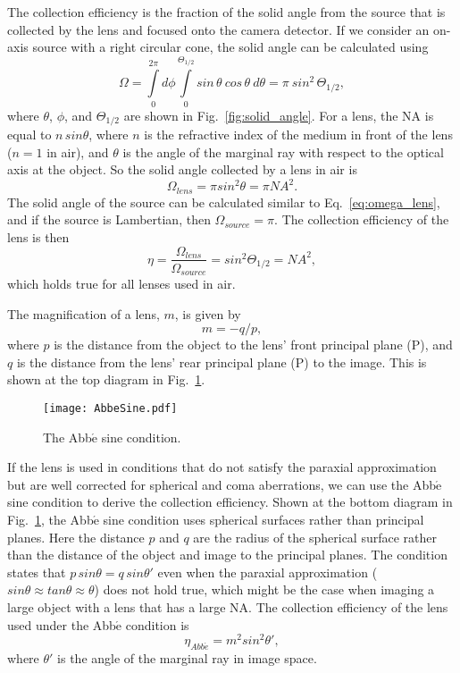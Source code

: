 The collection efficiency is the fraction of the solid angle from the source that is collected by the lens and focused onto the camera detector.  If we consider an on-axis source with a right circular cone, the solid angle can be calculated using
%
\begin{equation}
\label{eq:omega_lens}
\Omega = \int\limits_0^{2\pi} d \phi 
				\int\limits_0^{\Theta_{1/2}} sin \, \theta \ cos\, \theta \ d\theta = \pi \ sin^2 \, \Theta_{1/2},
\end{equation}
%
where $\theta$, $\phi$, and $\Theta_{1/2}$ are shown in Fig.~\ref{fig:solid_angle}.  For a lens, the NA is equal to $n \, sin \theta$, where $n$ is the refractive index of the medium in front of the lens ($n = 1$ in air), and $\theta$ is the angle of the marginal ray with respect to the optical axis at the object.  So the solid angle collected by a lens in air is
%
\begin{equation}
\Omega_{lens} = \pi sin^2 \theta = \pi NA^2.
\end{equation}
%
The solid angle of the source can be calculated similar to Eq.~\ref{eq:omega_lens}, and if the source is Lambertian, then $\Omega_{source} =  \pi$.  The collection efficiency of the lens is then
%
\begin{equation}
\label{eq:lens_collection_efficiency_all}
\eta = \frac{\Omega_{lens}}{\Omega_{source}} = sin^2 \Theta_{1/2} = NA^2,
\end{equation}
%
which holds true for all lenses used in air.

The magnification of a lens, $m$, is given by
%
\begin{equation}
m = -q/p,
\label{eqn:magnification}
\end{equation}
%
where $p$ is the distance from the object to the lens' front principal plane (P), and $q$ is the distance from the lens' rear principal plane (P\primoprime) to the image.  This is shown at the top diagram in Fig.~\ref{fig:Abbe}.
%
\begin{figure}[h]
\texttt{[image: AbbeSine.pdf]}
\caption{The Abb$\acute{\mathrm{e}}$ sine condition.}
\label{fig:Abbe}
\end{figure}
%
If the lens is used in conditions that do not satisfy the paraxial approximation but are well corrected for spherical and coma aberrations, we can use the Abb$\acute{\mathrm{e}}$ sine condition to derive the collection efficiency.  Shown at the bottom diagram in Fig.~\ref{fig:Abbe}, the Abb$\acute{\mathrm{e}}$ sine condition uses spherical surfaces rather than principal planes.  Here the distance $p$ and $q$ are the radius of the spherical surface rather than the distance of the object and image to the principal planes.  The condition states that $p \, sin \theta = q \, sin \theta'$ even when the paraxial approximation ($sin \theta \approx tan \theta \approx \theta $) does not hold true, which might be the case when imaging a large object with a lens that has a large NA.  The collection efficiency of the lens used under the Abb$\acute{\mathrm{e}}$ condition is
%
\begin{equation}
	\eta_{Abb\acute{e}} = m^2 sin^2 \theta',
\end{equation}
%
where $\theta'$ is the angle of the marginal ray in image space.

